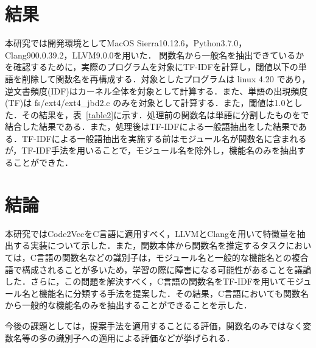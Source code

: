 \documentclass[submit,techrep,noauthor]{ipsj}
\begin{document}
\section{結果}
本研究では開発環境としてMacOS Sierra10.12.6，Python3.7.0，Clang900.0.39.2，LLVM9.0.0を用いた．
関数名から一般名を抽出できているかを確認するために，実際のプログラムを対象にTF-IDFを計算し，閾値以下の単語を削除して関数名を再構成する．対象としたプログラムは linux 4.20 であり，逆文書頻度(IDF)はカーネル全体を対象として計算する．また、単語の出現頻度(TF)は fs/ext4/ext4\_jbd2.c のみを対象として計算する．また，閾値は1.0とした．その結果を，表~\ref{table2}に示す．処理前の関数名は単語に分割したものをで結合した結果である．また，処理後はTF-IDFによる一般語抽出をした結果である．TF-IDFによる一般語抽出を実施する前はモジュール名が関数名に含まれるが，TF-IDF手法を用いることで，モジュール名を除外し，機能名のみを抽出することができた．

\section{結論}
本研究ではCode2VecをC言語に適用すべく，LLVMとClangを用いて特徴量を抽出する実装について示した．また，関数本体から関数名を推定するタスクにおいては，C言語の関数名などの識別子は，モジュール名と一般的な機能名との複合語で構成されることが多いため，学習の際に障害になる可能性があることを議論した．さらに，この問題を解決すべく，C言語の関数名をTF-IDFを用いてモジュール名と機能名に分類する手法を提案した．その結果，C言語においても関数名から一般的な機能名のみを抽出することができることを示した．

今後の課題としては，提案手法を適用することにる評価，関数名のみではなく変数名等の多の識別子への適用による評価などが挙げられる．










\end{document}
